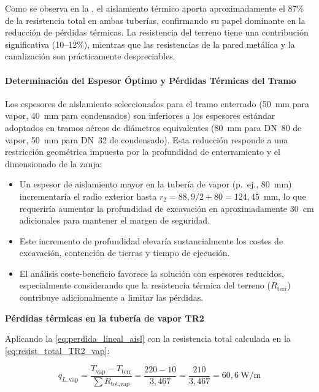 Como se observa en la , el aislamiento térmico aporta aproximadamente el 87\% de la resistencia total en ambas tuberías, confirmando su papel dominante en la reducción de pérdidas térmicas. La resistencia del terreno tiene una contribución significativa (10--12\%), mientras que las resistencias de la pared metálica y la canalización son prácticamente despreciables.

\paragraph{Determinación del Espesor Óptimo y Pérdidas Térmicas del Tramo}
\label{par:espesor_optimo_perdidas}

Los espesores de aislamiento seleccionados para el tramo enterrado (50~mm para vapor, 40~mm para condensados) son inferiores a los espesores estándar adoptados en tramos aéreos de diámetros equivalentes (80~mm para DN~80 de vapor, 50~mm para DN~32 de condensado). Esta reducción responde a una restricción geométrica impuesta por la profundidad de enterramiento y el dimensionado de la zanja:

\begin{itemize}[noitemsep]
	\item Un espesor de aislamiento mayor en la tubería de vapor (p.~ej., 80~mm) incrementaría el radio exterior hasta $r_2 = 88{,}9/2 + 80 = 124{,}45$~mm, lo que requeriría aumentar la profundidad de excavación en aproximadamente 30~cm adicionales para mantener el margen de seguridad.
	\item Este incremento de profundidad elevaría sustancialmente los costes de excavación, contención de tierras y tiempo de ejecución.
	\item El análisis coste-beneficio favorece la solución con espesores reducidos, especialmente considerando que la resistencia térmica del terreno ($R_{\text{terr}}$) contribuye adicionalmente a limitar las pérdidas.
\end{itemize}

\textbf{Pérdidas térmicas en la tubería de vapor TR2}

Aplicando la \eqref{eq:perdida_lineal_aisl} con la resistencia total calculada en la \eqref{eq:resist_total_TR2_vap}:

\begin{equation}
	q_{L,\text{vap}} = \frac{T_{\text{vap}} - T_{\text{terr}}}{\sum R_{\text{tot,vap}}} = \frac{220 - 10}{3{,}467} = \frac{210}{3{,}467} = 60{,}6~\text{W/m}
	\label{eq:perdida_lineal_TR2_vap}
\end{equation}

